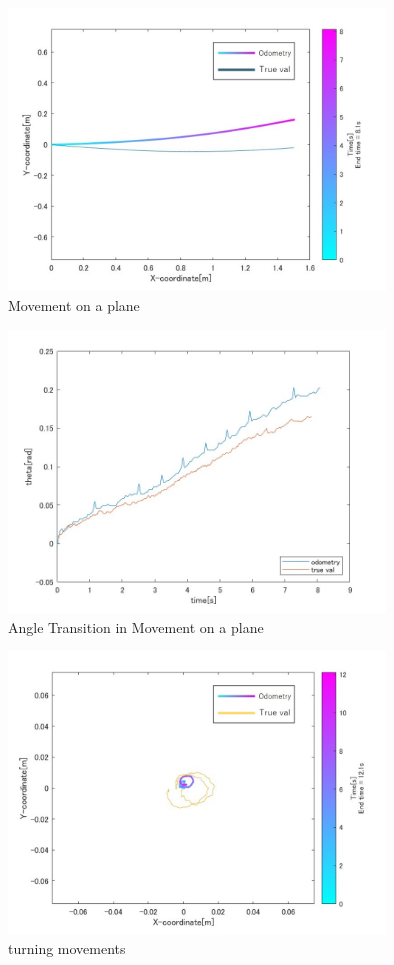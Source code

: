 \documentclass[a4paper,11pt]{jsarticle}
\begin{document}
\begin{figure}[H]\centering
\includegraphics[width=100mm]{fig_1_2.jpg}
\caption{Movement on a plane}
\label{fig:1}\vspace{0zh}\end{figure}

\begin{figure}[H]\centering
\includegraphics[width=100mm]{fig_2.jpg}
\caption{Angle Transition in Movement on a plane}
\label{fig:2}\vspace{0zh}\end{figure}


\begin{figure}[H]\centering
\includegraphics[width=100mm]{fig_3_2.jpg}
\caption{turning movements}
\label{fig:4}\vspace{0zh}\end{figure}
\end{document}
